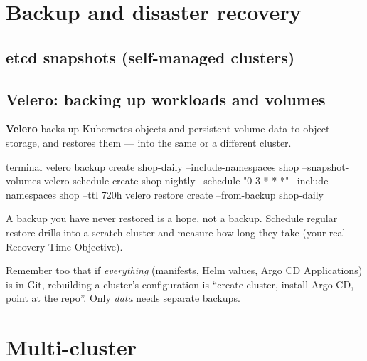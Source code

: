 \section{Backup and disaster recovery}

\subsection{etcd snapshots (self-managed clusters)}


\subsection{Velero: backing up workloads and volumes}

\textbf{Velero} backs up Kubernetes objects and persistent volume data to object
storage, and restores them --- into the same or a different cluster.

\begin{bashcode}{terminal}
velero backup create shop-daily --include-namespaces shop --snapshot-volumes
velero schedule create shop-nightly --schedule "0 3 * * *" --include-namespaces shop --ttl 720h
velero restore create --from-backup shop-daily
\end{bashcode}

\begin{warningbox}
A backup you have never restored is a hope, not a backup. Schedule regular
restore drills into a scratch cluster and measure how long they take (your
real Recovery Time Objective).
\end{warningbox}

Remember too that if \emph{everything} (manifests, Helm values, Argo CD
Applications) is in Git, rebuilding a cluster's configuration is ``create cluster,
install Argo CD, point at the repo''. Only \emph{data} needs separate backups.

\section{Multi-cluster}

